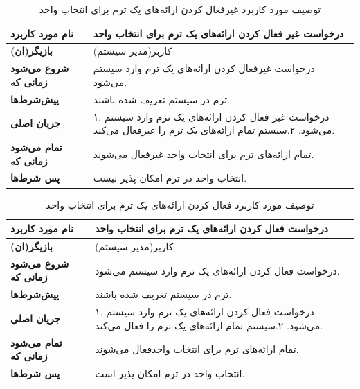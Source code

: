 \begin{table}
\begin{center}
\begin{tabular}{|p{5cm}|p{10cm}|}
	\hline
	\textbf{نام مورد کاربرد} &
درخواست غیر فعال کردن ارائه‌های یک ترم برای انتخاب واحد\\
	\hline
	\textbf{بازیگر(ان)} &
کاربر(مدیر سیستم)\\
	\hline
	\textbf{شروع می‌شود زمانی که} &
درخواست غیرفعال کردن ارائه‌های یک ترم وارد سیستم می‌شود.\\
	\hline
	\textbf{پیش‌شرط‌ها} &
 ترم در سیستم تعریف شده باشند.\\
	\hline
	\textbf{جریان اصلی} &
۱. درخواست غیر فعال کردن ارائه‌های یک ترم وارد سیستم می‌شود.\newline
۲.سیستم تمام ارائه‌های یک ترم را غیرفعال می‌کند.\\
	\hline
	\textbf{تمام می‌شود زمانی که} &
تمام ارائه‌های ترم برای انتخاب واحد غیرفعال می‌شوند.\\
	\hline
	\textbf{پس شرط‌ها} &
انتخاب واحد در ترم امکان پذیر نیست.\\
	\hline
\end{tabular}
\caption{\label{table:uc_disableofferings} توصیف مورد کاربرد غیرفعال کردن ارائه‌های یک ترم برای انتخاب واحد}
\end{center}
\end{table}

\begin{table}
\begin{center}
\begin{tabular}{|p{5cm}|p{10cm}|}
	\hline
	\textbf{نام مورد کاربرد} &
درخواست فعال کردن ارائه‌های یک ترم برای انتخاب واحد\\
	\hline
	\textbf{بازیگر(ان)} &
کاربر(مدیر سیستم)\\
	\hline
	\textbf{شروع می‌شود زمانی که} &
درخواست فعال کردن ارائه‌های یک ترم وارد سیستم می‌شود.\\
	\hline
	\textbf{پیش‌شرط‌ها} &
 ترم در سیستم تعریف شده باشند.\\
	\hline
	\textbf{جریان اصلی} &
۱. درخواست فعال کردن ارائه‌های یک ترم وارد سیستم می‌شود.\newline
۲.سیستم تمام ارائه‌های یک ترم را فعال می‌کند.\\
	\hline
	\textbf{تمام می‌شود زمانی که} &
تمام ارائه‌های ترم برای انتخاب واحدفعال می‌شوند.\\
	\hline
	\textbf{پس شرط‌ها} &
انتخاب واحد در ترم امکان پذیر است.\\
	\hline
\end{tabular}
\caption{\label{table:uc_enableofferings} توصیف مورد کاربرد فعال کردن ارائه‌های یک ترم برای انتخاب واحد}
\end{center}
\end{table}



